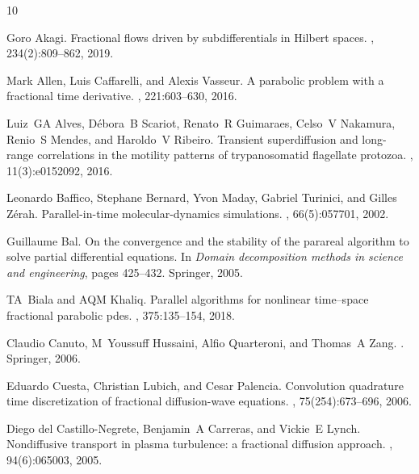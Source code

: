 \documentclass[12pt,a4paper]{article}
\begin{document}
%
%

\begin{thebibliography}{10}
	
	Goro Akagi.
	\newblock Fractional flows driven by subdifferentials in {Hilbert} spaces.
	, 234(2):809--862, 2019.
	
	Mark Allen, Luis Caffarelli, and Alexis Vasseur.
	\newblock A parabolic problem with a fractional time derivative.
	, 221:603--630,
	2016.
	
	Luiz~GA Alves, D{\'e}bora~B Scariot, Renato~R Guimaraes, Celso~V Nakamura,
	Renio~S Mendes, and Haroldo~V Ribeiro.
	\newblock Transient superdiffusion and long-range correlations in the motility
	patterns of trypanosomatid flagellate protozoa.
	, 11(3):e0152092, 2016.
	
	Leonardo Baffico, Stephane Bernard, Yvon Maday, Gabriel Turinici, and Gilles
	Z{\'e}rah.
	\newblock Parallel-in-time molecular-dynamics simulations.
	, 66(5):057701, 2002.
	
	Guillaume Bal.
	\newblock On the convergence and the stability of the parareal algorithm to
	solve partial differential equations.
	\newblock In {\em Domain decomposition methods in science and engineering},
	pages 425--432. Springer, 2005.
	
	TA~Biala and AQM Khaliq.
	\newblock Parallel algorithms for nonlinear time--space fractional parabolic
	pdes.
	, 375:135--154, 2018.
	
	Claudio Canuto, M~Youssuff Hussaini, Alfio Quarteroni, and Thomas~A Zang.
	.
	\newblock Springer, 2006.
	
	Eduardo Cuesta, Christian Lubich, and Cesar Palencia.
	\newblock Convolution quadrature time discretization of fractional
	diffusion-wave equations.
	, 75(254):673--696, 2006.
	
	Diego del Castillo-Negrete, Benjamin~A Carreras, and Vickie~E Lynch.
	\newblock Nondiffusive transport in plasma turbulence: a fractional diffusion
	approach.
	, 94(6):065003, 2005.
	

\end{thebibliography}
\end{document}
